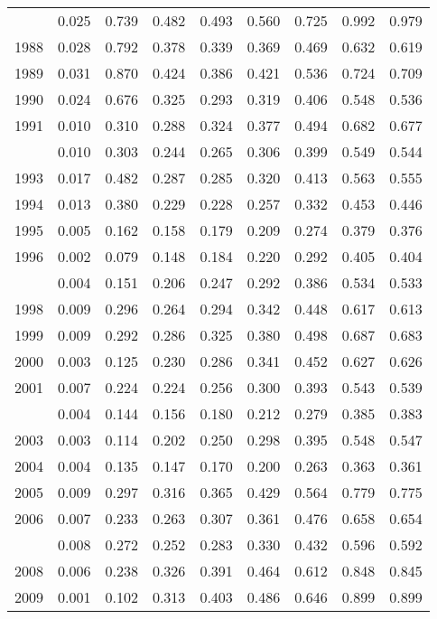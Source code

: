 \documentclass[
]{article}
\begin{document}
\begin{longtable}[t]{lrrrrrrrr}
\endfoot
\bottomrule
\endlastfoot
1987 & 0.025 & 0.739 & 0.482 & 0.493 & 0.560 & 0.725 & 0.992 & 0.979\\
1988 & 0.028 & 0.792 & 0.378 & 0.339 & 0.369 & 0.469 & 0.632 & 0.619\\
1989 & 0.031 & 0.870 & 0.424 & 0.386 & 0.421 & 0.536 & 0.724 & 0.709\\
1990 & 0.024 & 0.676 & 0.325 & 0.293 & 0.319 & 0.406 & 0.548 & 0.536\\
1991 & 0.010 & 0.310 & 0.288 & 0.324 & 0.377 & 0.494 & 0.682 & 0.677\\
\addlinespace
1992 & 0.010 & 0.303 & 0.244 & 0.265 & 0.306 & 0.399 & 0.549 & 0.544\\
1993 & 0.017 & 0.482 & 0.287 & 0.285 & 0.320 & 0.413 & 0.563 & 0.555\\
1994 & 0.013 & 0.380 & 0.229 & 0.228 & 0.257 & 0.332 & 0.453 & 0.446\\
1995 & 0.005 & 0.162 & 0.158 & 0.179 & 0.209 & 0.274 & 0.379 & 0.376\\
1996 & 0.002 & 0.079 & 0.148 & 0.184 & 0.220 & 0.292 & 0.405 & 0.404\\
\addlinespace
1997 & 0.004 & 0.151 & 0.206 & 0.247 & 0.292 & 0.386 & 0.534 & 0.533\\
1998 & 0.009 & 0.296 & 0.264 & 0.294 & 0.342 & 0.448 & 0.617 & 0.613\\
1999 & 0.009 & 0.292 & 0.286 & 0.325 & 0.380 & 0.498 & 0.687 & 0.683\\
2000 & 0.003 & 0.125 & 0.230 & 0.286 & 0.341 & 0.452 & 0.627 & 0.626\\
2001 & 0.007 & 0.224 & 0.224 & 0.256 & 0.300 & 0.393 & 0.543 & 0.539\\
\addlinespace
2002 & 0.004 & 0.144 & 0.156 & 0.180 & 0.212 & 0.279 & 0.385 & 0.383\\
2003 & 0.003 & 0.114 & 0.202 & 0.250 & 0.298 & 0.395 & 0.548 & 0.547\\
2004 & 0.004 & 0.135 & 0.147 & 0.170 & 0.200 & 0.263 & 0.363 & 0.361\\
2005 & 0.009 & 0.297 & 0.316 & 0.365 & 0.429 & 0.564 & 0.779 & 0.775\\
2006 & 0.007 & 0.233 & 0.263 & 0.307 & 0.361 & 0.476 & 0.658 & 0.654\\
\addlinespace
2007 & 0.008 & 0.272 & 0.252 & 0.283 & 0.330 & 0.432 & 0.596 & 0.592\\
2008 & 0.006 & 0.238 & 0.326 & 0.391 & 0.464 & 0.612 & 0.848 & 0.845\\
2009 & 0.001 & 0.102 & 0.313 & 0.403 & 0.486 & 0.646 & 0.899 & 0.899\\

\end{longtable}
\end{document}

